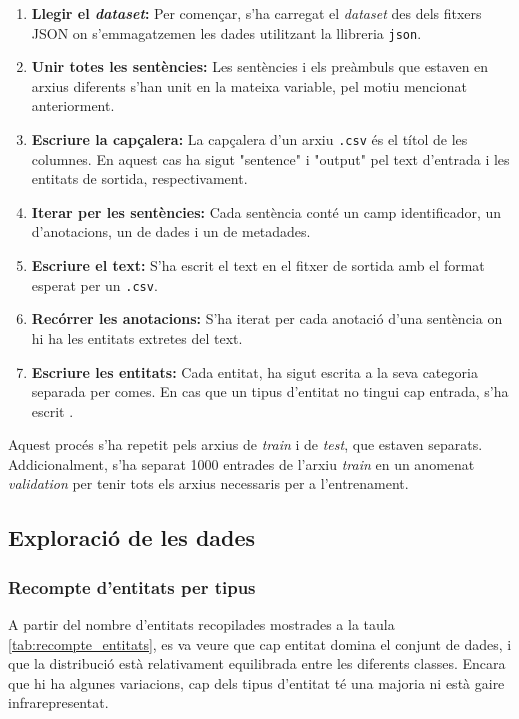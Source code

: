 \begin{enumerate}
  \item \textbf{Llegir el \textit{dataset}:} Per començar, s'ha carregat el \textit{dataset} des dels fitxers JSON on s'emmagatzemen les dades utilitzant la llibreria \texttt{json}.
  \item \textbf{Unir totes les sentències:} Les sentències i els preàmbuls que estaven en arxius diferents s'han unit en la mateixa variable, pel motiu mencionat anteriorment.
  \item \textbf{Escriure la capçalera:} La capçalera d'un arxiu \texttt{.csv} és el títol de les columnes. En aquest cas ha sigut "sentence" i "output" pel text d'entrada i les entitats de sortida, respectivament.
  \item \textbf{Iterar per les sentències:} Cada sentència conté un camp identificador, un d'anotacions, un de dades i un de metadades.
  \item \textbf{Escriure el text:} S'ha escrit el text en el fitxer de sortida amb el format esperat per un \texttt{.csv}.
  \item \textbf{Recórrer les anotacions:} S'ha iterat per cada anotació d'una sentència on hi ha les entitats extretes del text.
  \item \textbf{Escriure les entitats:} Cada entitat, ha sigut escrita a la seva categoria separada per comes. En cas que un tipus d'entitat no tingui cap entrada, s'ha escrit .
\end{enumerate}

Aquest procés s'ha repetit pels arxius de \textit{train} i de \textit{test}, que estaven separats. Addicionalment, s'ha separat 1000 entrades de l'arxiu \textit{train} en un anomenat \textit{validation} per tenir tots els arxius necessaris per a l'entrenament.



\subsection{Exploració de les dades}

\subsubsection{Recompte d'entitats per tipus}
A partir del nombre d'entitats recopilades mostrades a la taula \ref{tab:recompte_entitats}, es va veure que cap entitat domina el conjunt de dades, i que la distribució està relativament equilibrada entre les diferents classes. Encara que hi ha algunes variacions, cap dels tipus d'entitat té una majoria ni està gaire infrarepresentat.

